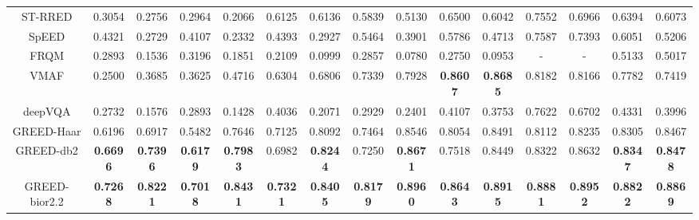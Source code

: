\documentclass[journal]{IEEEtran}
\begin{document}
\begin{table*}[t]
{\begin{tabular}{|c||c|c|c|c|c|c|c|c|c|c|c|c|c|c|}
			ST-RRED \cite{soundararajan2012video} & 0.3054 & 0.2756 & 0.2964 & 0.2066 & 0.6125 & 0.6136 & 0.5839 & 0.5130 & 0.6500 & 0.6042 & 0.7552 & 0.6966 & 0.6394 & 0.6073\\ 
			SpEED \cite{bampis2017speed} & 0.4321 & 0.2729 & 0.4107 & 0.2332 & 0.4393 & 0.2927 & 0.5464 & 0.3901 & 0.5786 & 0.4713 & 0.7587 & 0.7393 & 0.6051 & 0.5206\\ 
			FRQM \cite{zhang2017frame} & 0.2893 & 0.1536 & 0.3196 & 0.1851 & 0.2109 & 0.0999 & 0.2857 & 0.0780 & 0.2750 & 0.0953 & - & - & 0.5133 & 0.5017\\ 
			VMAF \cite{VMAF2016} & 0.2500 & 0.3685 & 0.3625 & 0.4716 & 0.6304 & 0.6806 & 0.7339 & 0.7928 & \textbf{0.8607} & \textbf{0.8685} & 0.8182 & 0.8166 & 0.7782 & 0.7419\\ 
			deepVQA \cite{kim2018deep} & 0.2732 & 0.1576 & 0.2893 & 0.1428 & 0.4036 & 0.2071 & 0.2929 & 0.2401 & 0.4107 & 0.3753 & 0.7622 & 0.6702 & 0.4331 & 0.3996\\ \hline
			GREED-Haar & 0.6196 & 0.6917 & 0.5482 & 0.7646 & 0.7125 & 0.8092 & 0.7464 & 0.8546 & 0.8054 & 0.8491 & 0.8112 & 0.8235 & 0.8305 & 0.8467\\
			GREED-db2 & \textbf{0.6696} & \textbf{0.7396} & \textbf{0.6179} & \textbf{0.7983} & 0.6982 & \textbf{0.8244} & 0.7250 & \textbf{0.8671} & 0.7518 & 0.8449 & 0.8322 & 0.8632 & \textbf{0.8347} & \textbf{0.8478}\\
			GREED-bior2.2 & \textbf{0.7268} & \textbf{0.8221} & \textbf{0.7018} & \textbf{0.8431} & \textbf{0.7321} & \textbf{0.8405} & \textbf{0.8179} & \textbf{0.8960} & \textbf{0.8643} & \textbf{0.8915} & \textbf{0.8881} & \textbf{0.8952} & \textbf{0.8822} & \textbf{0.8869}\\
			\hline
		\end{tabular}
	}
\end{table*}
\end{document}

